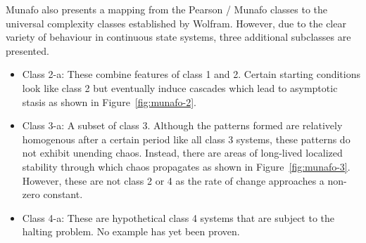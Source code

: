 Munafo also presents a mapping from the Pearson / Munafo classes to the universal complexity classes established by Wolfram. However, due to the clear variety of behaviour in continuous state systems, three additional subclasses are presented.
\begin{itemize}
    \item Class 2-a: These combine features of class 1 and 2. Certain starting conditions look like class 2 but eventually induce cascades which lead to asymptotic stasis as shown in Figure~\ref{fig:munafo-2}.
    \item Class 3-a: A subset of class 3. Although the patterns formed are relatively homogenous after a certain period like all class 3 systems, these patterns do not exhibit unending chaos. Instead, there are areas of long-lived localized stability through which chaos propagates as shown in Figure~\ref{fig:munafo-3}. However, these are not class 2 or 4 as the rate of change approaches a non-zero constant.
    \item Class 4-a: These are hypothetical class 4 systems that are subject to the halting problem. No example has yet been proven.
\end{itemize}


